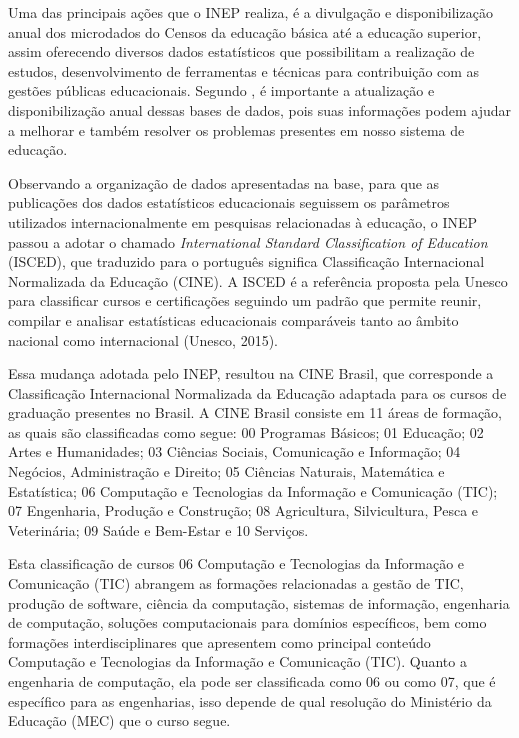 Uma das principais ações que o INEP realiza, é a divulgação e disponibilização anual dos microdados do Censos da educação básica até a educação superior, assim oferecendo diversos dados estatísticos que possibilitam a realização de estudos, desenvolvimento de ferramentas e técnicas para contribuição com as gestões públicas educacionais. Segundo , é importante a atualização e disponibilização anual dessas bases de dados, pois suas informações podem ajudar a melhorar e também resolver os problemas presentes em nosso sistema de educação.


Observando a organização de dados apresentadas na base, para que as publicações dos dados estatísticos educacionais seguissem os parâmetros utilizados internacionalmente em pesquisas relacionadas à educação, o INEP passou a adotar o chamado \textit{International Standard Classification of Education} (ISCED), que traduzido para o português significa Classificação Internacional Normalizada da Educação (CINE). A ISCED é a referência proposta pela Unesco para classificar cursos e certificações seguindo um padrão que permite reunir, compilar e analisar estatísticas educacionais comparáveis tanto ao âmbito nacional como internacional (Unesco, 2015).

Essa mudança adotada pelo INEP, resultou na CINE Brasil, que corresponde a Classificação Internacional Normalizada da Educação adaptada para os cursos de graduação presentes no Brasil. A CINE Brasil consiste em 11 áreas de formação, as quais são classificadas como segue: 00 Programas Básicos; 01 Educação; 02 Artes e Humanidades; 03 Ciências Sociais, Comunicação e Informação; 04 Negócios, Administração e Direito; 05 Ciências Naturais, Matemática e Estatística; 06 Computação e Tecnologias da Informação e Comunicação (TIC); 07 Engenharia, Produção e Construção; 08 Agricultura, Silvicultura, Pesca e Veterinária; 09 Saúde e Bem-Estar e 10 Serviços. 

Esta classificação de cursos 06 Computação e Tecnologias da Informação e Comunicação (TIC) abrangem as formações relacionadas a gestão de TIC, produção de software, ciência da computação, sistemas de informação, engenharia de computação, soluções computacionais para domínios específicos, bem como formações interdisciplinares que apresentem como principal conteúdo Computação e Tecnologias da Informação e Comunicação (TIC). Quanto a engenharia de computação, ela pode ser classificada como 06 ou como 07, que é específico para as engenharias, isso depende de qual resolução do Ministério da Educação (MEC) que o curso segue.

